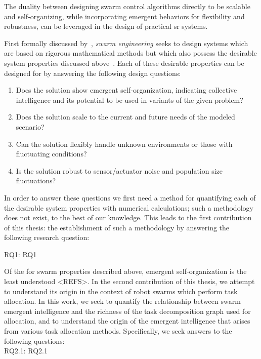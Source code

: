 The duality between designing swarm control algorithms directly to be scalable
and self-organizing, while incorporating emergent behaviors for flexibility and
robustness, can be leveraged in the design of practical \gls{sr}
systems.

First formally discussed by~\cite{Winfield2005}, \emph{swarm engineering} seeks
to design systems which are based on rigorous mathematical methods but which
also possess the desirable system properties discussed
above~\cite{Brambilla2013a}.  Each of these desirable properties can be designed
for by answering the following design questions:
%
\begin{enumerate}
\item {Does the solution show emergent self-organization, indicating collective
    intelligence and its potential to be used in variants of the given problem?
  }
\item{Does the solution scale to the current and future needs of the modeled
    scenario?}
\item {Can the solution flexibly handle unknown environments or those with
    fluctuating conditions?}

\item {Is the solution robust to sensor/actuator noise and population size
    fluctuations? %
  }
\end{enumerate}
%
In order to answer these questions we first need a method for quantifying each
of the desirable system properties with numerical calculations; such a
methodology does not exist, to the best of our knowledge. This leads to the
first contribution of this thesis: the establishment of such a methodology by
answering the following research question:

\noindent
\gls{RQ1}: \glsdesc{RQ1}

Of the for swarm properties described above, emergent self-organization is the
least understood <REFS>. In the second contribution of this thesis, we attempt
to understand its origin in the context of robot swarms which perform task
allocation. 
In this work, we seek to quantify
the relationship between swarm emergent intelligence and the richness of the
task decomposition graph used for allocation, and to understand the origin of
the emergent intelligence that arises from various task allocation
methods. Specifically, we seek
answers to the following questions:\\[-3ex]
%
\noindent
\gls{RQ2.1}: \glsdesc{RQ2.1}

